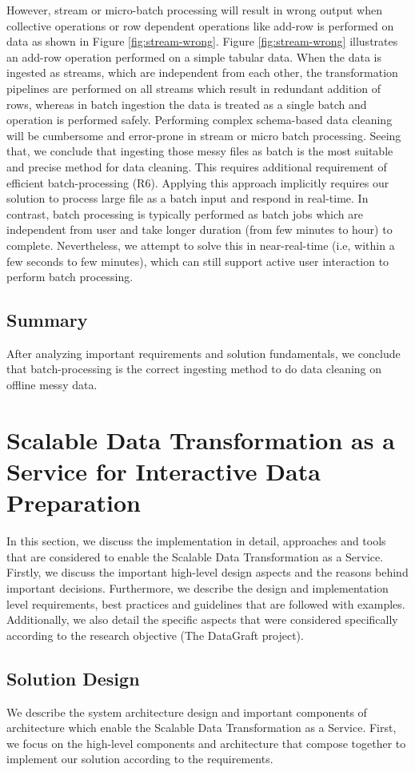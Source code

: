 However, stream or micro-batch processing will result in wrong output when collective operations or row dependent operations like add-row is performed on data as shown in Figure \ref{fig:stream-wrong}. Figure \ref{fig:stream-wrong} illustrates an add-row operation performed on a simple tabular data. When the data is ingested as streams, which are independent from each other, the transformation pipelines are performed on all streams which result in redundant addition of rows, whereas in batch ingestion the data is treated as a single batch and operation is performed safely. Performing complex schema-based data cleaning will be cumbersome and error-prone in stream or micro batch processing. Seeing that, we conclude that ingesting those messy files as batch is the most suitable and precise method for data cleaning. This requires additional requirement of efficient batch-processing (R6). Applying this approach implicitly requires our solution to process large file as a batch input and respond in real-time. In contrast, batch processing is typically performed as batch jobs which are independent from user \cite{beyondbatchprocessing} and take longer duration (from few minutes to hour) to complete. Nevertheless, we attempt to solve this in near-real-time (i.e, within a few seconds to few minutes), which can still support active user interaction to perform batch processing. 
\subsection{Summary}
After analyzing important requirements and solution fundamentals, we conclude that batch-processing is the correct ingesting method to do data cleaning on offline messy data.
\section{Scalable Data Transformation as a Service for Interactive Data Preparation}
In this section, we discuss the implementation in detail, approaches and tools that are considered to enable the Scalable Data Transformation as a Service. Firstly, we discuss the important high-level design aspects and the reasons behind important decisions. Furthermore, we describe the design and implementation level requirements, best practices and guidelines that are followed with examples.  Additionally, we also detail the specific aspects that were considered specifically according to the research objective (The DataGraft project). 
\subsection{Solution Design}
We describe the system architecture design and important components of architecture which enable the Scalable Data Transformation as a Service. First, we focus on the high-level components and architecture that compose together to implement our solution according to the requirements.  

